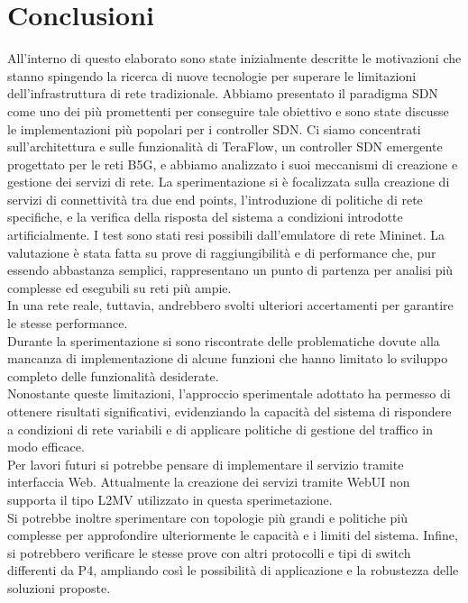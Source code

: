 \chapter{Conclusioni}
All'interno di questo elaborato sono state inizialmente descritte le motivazioni che stanno spingendo la ricerca di 
nuove tecnologie per superare le limitazioni dell'infrastruttura di rete tradizionale.
Abbiamo presentato il paradigma SDN come uno dei più promettenti per conseguire tale obiettivo e 
sono state discusse le implementazioni più popolari per i controller SDN. 
Ci siamo concentrati sull'architettura e sulle funzionalità di TeraFlow, un controller SDN emergente progettato per le reti B5G, e abbiamo analizzato i suoi meccanismi di creazione e gestione dei servizi di rete.
La sperimentazione si è focalizzata sulla creazione di servizi di connettività tra due end points, 
l'introduzione di politiche di rete specifiche, e la verifica della risposta del sistema a condizioni introdotte artificialmente.
I test sono stati resi possibili dall'emulatore di rete Mininet.
La valutazione è stata fatta su prove di raggiungibilità e di performance che, pur
essendo abbastanza semplici, rappresentano un punto di partenza per analisi più complesse ed
esegubili su reti più ampie. 
\\In una rete reale, tuttavia, andrebbero svolti ulteriori accertamenti per garantire le stesse performance.
\\Durante la sperimentazione si sono riscontrate delle problematiche dovute alla mancanza di implementazione
di alcune funzioni che hanno limitato lo sviluppo completo delle funzionalità desiderate.
\\Nonostante queste limitazioni, l'approccio sperimentale adottato ha permesso di ottenere risultati significativi, 
evidenziando la capacità del sistema di rispondere a condizioni di rete variabili e di applicare politiche di gestione del traffico in modo efficace.
\\Per lavori futuri si potrebbe pensare di implementare il servizio tramite interfaccia Web.
Attualmente la creazione dei servizi tramite WebUI non supporta il tipo L2MV utilizzato in questa sperimetazione.
\\Si potrebbe inoltre sperimentare con topologie più grandi e politiche più complesse per approfondire ulteriormente le capacità e i limiti del sistema. 
Infine, si potrebbero verificare le stesse prove  con altri protocolli e tipi di switch differenti da P4,
ampliando così le possibilità di applicazione e la robustezza delle soluzioni proposte.
